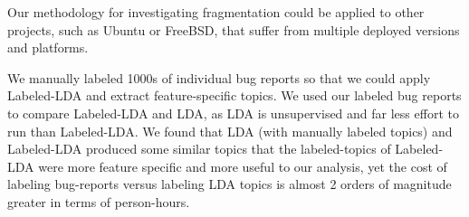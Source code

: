 \documentclass[10pt, conference, compsocconf]{IEEEtran}
\begin{document}
Our methodology for investigating fragmentation could be applied to
other projects, such as Ubuntu or FreeBSD, that suffer from multiple
deployed versions and platforms.

We manually labeled 1000s of individual bug reports so that we could
apply Labeled-LDA and extract 
 feature-specific topics. We used our labeled bug reports to compare Labeled-LDA
and LDA, as LDA is unsupervised and far less effort to run than
Labeled-LDA.
We found that LDA (with manually labeled topics) and Labeled-LDA
produced some similar topics that the labeled-topics of Labeled-LDA were more
feature specific and more useful to our analysis, yet the cost of
labeling bug-reports versus labeling LDA topics is almost 2 orders of
magnitude greater in terms of person-hours.



\end{document}
